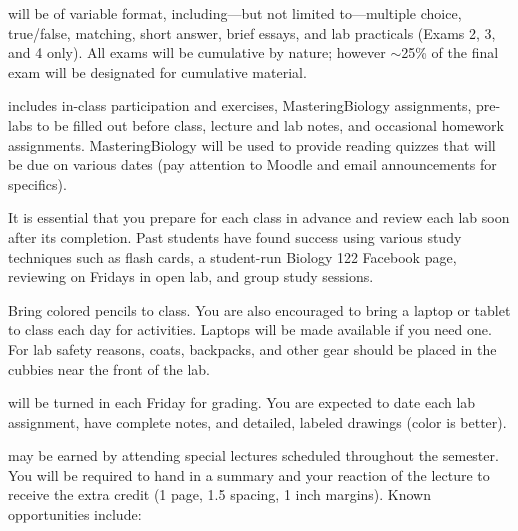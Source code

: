 \documentclass{tufte-handout}
\begin{document}
\begin{fullwidth}




 will be of variable format, including---but not limited to---multiple choice, true/false, matching, short answer, brief essays, and lab practicals (Exams 2, 3, and 4 only). All exams will be cumulative by nature; however $\sim$25\% of the final exam will be designated for cumulative material. 

 includes in-class participation and exercises, MasteringBiology assignments, pre-labs to be filled out before class, lecture and lab notes, and occasional homework assignments. MasteringBiology will be used to provide reading quizzes that will be due on various dates (pay attention to Moodle and email announcements for specifics). 

It is essential that you prepare for each class in advance and review each lab soon after its completion. Past students have found success using various study techniques such as flash cards, a student-run Biology 122 Facebook page, reviewing on Fridays in open lab, and group study sessions. 

Bring colored pencils to class. You are also encouraged to bring a laptop or tablet to class each day for activities. Laptops will be made available if you need one. For lab safety reasons, coats, backpacks, and other gear should be placed in the cubbies near the front of the lab. 

 will be turned in each Friday for grading. You are expected to date each lab assignment, have complete notes, and detailed, labeled drawings (color is better).  

 may be earned by attending special lectures scheduled throughout the semester.  You will be required to hand in a summary and your reaction of the lecture to receive the extra credit (1 page, 1.5 spacing, 1 inch margins). Known opportunities include:


\end{fullwidth}
\end{document}

